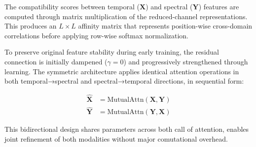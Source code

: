 \documentclass[conference]{IEEEtran}
\begin{document}
The compatibility scores between temporal ($\mathbf{X}$) and spectral ($\mathbf{Y}$) features are computed through matrix multiplication of the reduced-channel representations. This produces an $L \times L$ affinity matrix that represents position-wise cross-domain correlations before applying row-wise softmax normalization.

To preserve original feature stability during early training, the residual connection is initially dampened ($\gamma=0$) and progressively strengthened through learning. The symmetric architecture applies identical attention operations in both temporal→spectral and spectral→temporal directions, in sequential form:

\begin{equation}
    \begin{aligned}
        \mathbf{\widehat{X}} & = \text{MutualAttn}(\mathbf{X}, \mathbf{Y}) \\
        \mathbf{\widehat{Y}} & = \text{MutualAttn}(\mathbf{Y}, \mathbf{X})
    \end{aligned}
\end{equation}

This bidirectional design shares parameters across both call of attention, enables joint refinement of both modalities without major comutational overhead.





\end{document}
